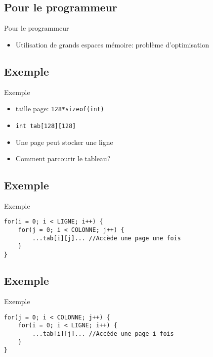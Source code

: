 \begin{frame}{\sectitle}
\def\subsectitle{Pour le programmeur}
\subsection{\subsectitle}
\begin{block}{\subsectitle}
\begin{itemize}
    \item Utilisation de grands espaces mémoire: problème d'optimisation
\end{itemize}
\end{block}

\def\subsectitle{Exemple}
\subsection{\subsectitle}
\begin{exampleblock}{\subsectitle}
\begin{itemize}
    \item taille page: \texttt{128*sizeof(int)}
    \item \texttt{int tab[128][128]}
    \item Une page peut stocker une ligne
    \item Comment parcourir le tableau?
\end{itemize}
\end{exampleblock}
\end{frame}


\begin{frame}[containsverbatim]{\sectitle}
\def\subsectitle{Exemple}
\subsection{\subsectitle}
\begin{exampleblock}{\subsectitle}
\begin{verbatim}
for(i = 0; i < LIGNE; i++) {
    for(j = 0; i < COLONNE; j++) {
        ...tab[i][j]... //Accède une page une fois
    }
}
\end{verbatim}
\end{exampleblock}

\def\subsectitle{Exemple}
\subsection{\subsectitle}
\begin{exampleblock}{\subsectitle}
\begin{verbatim}
for(j = 0; i < COLONNE; j++) {
    for(i = 0; i < LIGNE; i++) {
        ...tab[i][j]... //Accède une page i fois
    }
}
\end{verbatim}

\end{exampleblock}

\end{frame}


